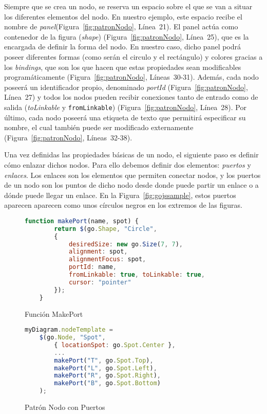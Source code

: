 Siempre que se crea un nodo, se reserva un espacio sobre el que se van a situar los diferentes elementos del nodo. En nuestro ejemplo, este espacio recibe el nombre de \emph{panel}(Figura~\ref{fig:patronNodo}, Línea~21). El panel actúa como contenedor de la figura (\emph{shape}) (Figura~\ref{fig:patronNodo}, Línea~25), que es la encargada de definir la forma del nodo. En nuestro caso, dicho panel podrá poseer diferentes formas (como serán el circulo y el rectángulo) y colores gracias a los \emph{bindings}, que son los que hacen que estas propiedades sean modificables programáticamente (Figura~\ref{fig:patronNodo}, Líneas~30-31). Además, cada nodo poseerá un identificador propio, denominado \emph{portId} (Figura~\ref{fig:patronNodo}, Línea~27) y todos los nodos pueden recibir conexiones tanto de entrado como de salida (\emph{toLinkable} y \texttt{fromLinkable}) (Figura~\ref{fig:patronNodo}, Línea~28). Por último, cada nodo poseerá una etiqueta de texto que permitirá especificar su nombre, el cual también puede ser modificado externamente (Figura~\ref{fig:patronNodo}, Líneas~32-38).

Una vez definidas las propiedades básicas de un nodo, el siguiente paso es definir cómo enlazar dichos nodos. Para ello debemos definir dos elementos: \emph{puertos} y \emph{enlaces}. Los enlaces son los elementos que permiten conectar nodos, y los puertos de un nodo son los puntos de dicho nodo desde donde puede partir un enlace o a dónde puede llegar un enlace.  En la Figura~\ref{fig:gojssample}, estos puertos aparecen aparecen como unos círculos negros en los extremos de las figuras.

\begin{figure}[H]
	\centering
	\begin{lstlisting}[language=JavaScript]
	function makePort(name, spot) {
		return $(go.Shape, "Circle",
		{
			desiredSize: new go.Size(7, 7),
			alignment: spot,
			alignmentFocus: spot,
			portId: name,
			fromLinkable: true, toLinkable: true,
			cursor: "pointer"
		});
	}\end{lstlisting}
	\caption{Función MakePort}
	\label{fig:funcionMakeport}
\end{figure}

\begin{figure}[H]
	\centering
	\begin{lstlisting}[language=JavaScript]
	myDiagram.nodeTemplate =
	$(go.Node, "Spot",
		{ locationSpot: go.Spot.Center },
		...
		makePort("T", go.Spot.Top),
		makePort("L", go.Spot.Left),
		makePort("R", go.Spot.Right),
		makePort("B", go.Spot.Bottom)
	);\end{lstlisting}
	\caption{Patrón Nodo con Puertos}
	\label{fig:patronNodoFinal}
\end{figure}

